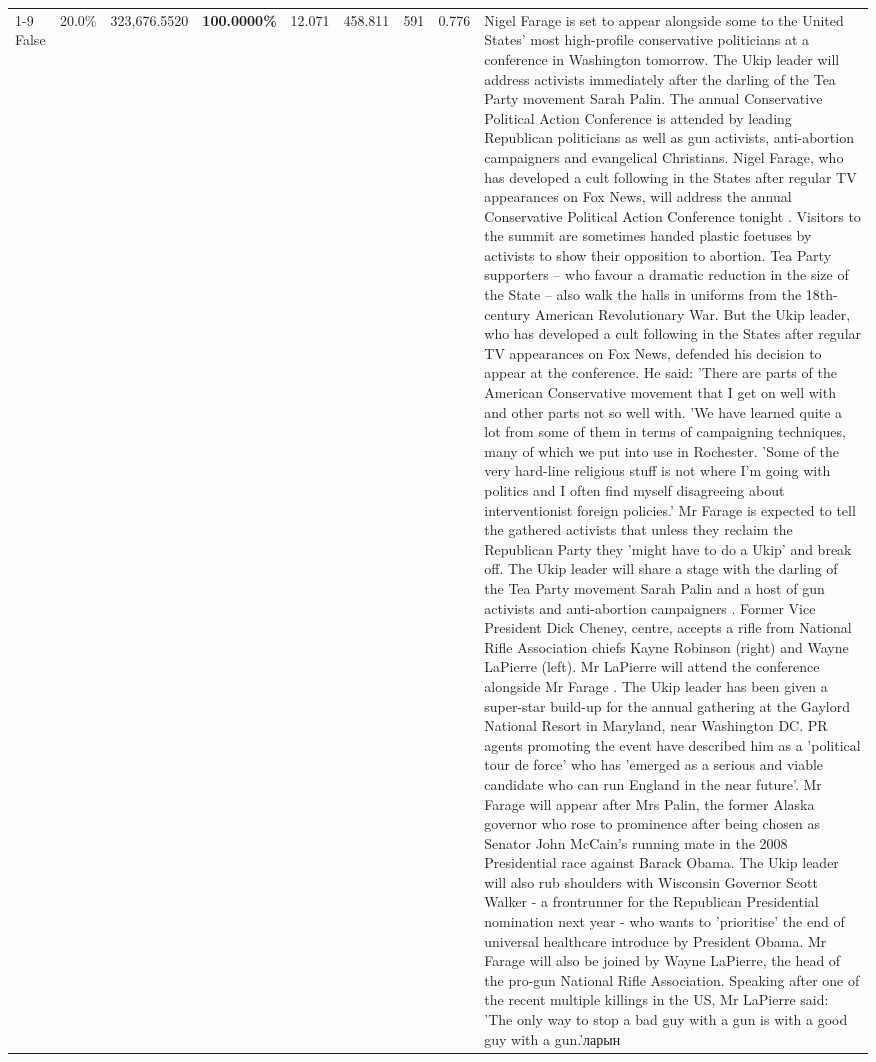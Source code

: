 \begin{table}[H]
\begin{tabular}{lllrlllll}
\cline{1-9}
False & 20.0\% & 323,676.5520 & \bfseries \color{red} 100.0000\% & 12.071 & 458.811 & 591 & 0.776 & Nigel Farage is set to appear alongside some to the United States' most high-profile conservative politicians at a conference in Washington tomorrow. The Ukip leader will address activists immediately after the darling of the Tea Party movement Sarah Palin. The annual Conservative Political Action Conference is attended by leading Republican politicians as well as gun activists, anti-abortion campaigners and evangelical Christians. Nigel Farage, who has developed a cult following in the States after regular TV appearances on Fox News, will address the annual Conservative Political Action Conference tonight . Visitors to the summit are sometimes handed plastic foetuses by activists to show their opposition to abortion. Tea Party supporters – who favour a dramatic reduction in the size of the State – also walk the halls in uniforms from the 18th-century American Revolutionary War. But the Ukip leader, who has developed a cult following in the States after regular TV appearances on Fox News, defended his decision to appear at the conference. He said: 'There are parts of the American Conservative movement that I get on well with and other parts not so well with. 'We have learned quite a lot from some of them in terms of campaigning techniques, many of which we put into use in Rochester. 'Some of the very hard-line religious stuff is not where I'm going with politics and I often find myself disagreeing about interventionist foreign policies.' Mr Farage is expected to tell the gathered activists that unless they reclaim the Republican Party they 'might have to do a Ukip' and break off. The Ukip leader will share a stage with the darling of the Tea Party movement Sarah Palin and a host of gun activists and anti-abortion campaigners . Former Vice President Dick Cheney, centre, accepts a rifle from National Rifle Association chiefs Kayne Robinson (right) and Wayne LaPierre (left). Mr LaPierre will attend the conference alongside Mr Farage . The Ukip leader has been given a super-star build-up for the annual gathering at the Gaylord National Resort in Maryland, near Washington DC. PR agents promoting the event have described him as a 'political tour de force' who has 'emerged as a serious and viable candidate who can run England in the near future'. Mr Farage will appear after Mrs Palin, the former Alaska governor who rose to prominence after being chosen as Senator John McCain's running mate in the 2008 Presidential race against Barack Obama. The Ukip leader will also rub shoulders with Wisconsin Governor Scott Walker - a frontrunner for the Republican Presidential nomination next year - who wants to 'prioritise' the end of universal healthcare introduce by President Obama. Mr Farage will also be joined by Wayne LaPierre, the head of the pro-gun National Rifle Association. Speaking after one of the recent multiple killings in the US, Mr LaPierre said: 'The only way to stop a bad guy with a gun is with a good guy with a gun.'ларын \\

\end{tabular}
\end{table}

